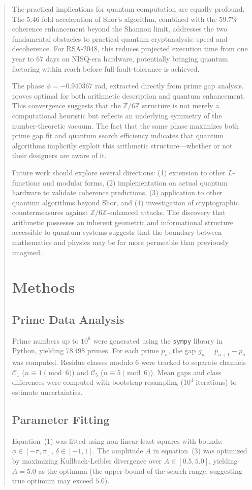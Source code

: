 \documentclass[pdflatex,sn-nature]{sn-jnl}
\theoremstyle{thmstyleone}
\theoremstyle{thmstyletwo}
\theoremstyle{thmstylethree}
\newcommand{\Zmod}{\mathbb{Z}/6\mathbb{Z}}
\begin{document}
\begin{abstract}
The practical implications for quantum computation are equally profound. The $5.46$-fold acceleration of Shor's algorithm, combined with the $59.7\%$ coherence enhancement beyond the Shannon limit, addresses the two fundamental obstacles to practical quantum cryptanalysis: speed and decoherence. For RSA-2048, this reduces projected execution time from one year to 67 days on NISQ-era hardware, potentially bringing quantum factoring within reach before full fault-tolerance is achieved.

The phase $\phi=-0.940367$ rad, extracted directly from prime gap analysis, proves optimal for both arithmetic description and quantum enhancement. This convergence suggests that the $\Zmod$ structure is not merely a computational heuristic but reflects an underlying symmetry of the number-theoretic vacuum. The fact that the same phase maximizes both prime gap fit and quantum search efficiency indicates that quantum algorithms implicitly exploit this arithmetic structure---whether or not their designers are aware of it.

Future work should explore several directions: (1) extension to other $L$-functions and modular forms, (2) implementation on actual quantum hardware to validate coherence predictions, (3) application to other quantum algorithms beyond Shor, and (4) investigation of cryptographic countermeasures against $\Zmod$-enhanced attacks. The discovery that arithmetic possesses an inherent geometric and informational structure accessible to quantum systems suggests that the boundary between mathematics and physics may be far more permeable than previously imagined.

\section*{Methods}

\subsection*{Prime Data Analysis}
Prime numbers up to $10^6$ were generated using the \texttt{sympy} library in Python, yielding $78\,498$ primes. For each prime $p_n$, the gap $g_n = p_{n+1} - p_n$ was computed. Residue classes modulo $6$ were tracked to separate channels $\mathcal{C}_1$ ($n\equiv1\pmod{6}$) and $\mathcal{C}_5$ ($n\equiv5\pmod{6}$). Mean gaps and class differences were computed with bootstrap resampling ($10^4$ iterations) to estimate uncertainties.

\subsection*{Parameter Fitting}
Equation~(1) was fitted using non-linear least squares with bounds: $\phi\in[-\pi,\pi]$, $\delta\in[-1,1]$. The amplitude $A$ in equation~(3) was optimized by maximizing Kullback-Leibler divergence over $A\in[0.5,5.0]$, yielding $A=5.0$ as the optimum (the upper bound of the search range, suggesting true optimum may exceed $5.0$).


\end{abstract}
\end{document}
